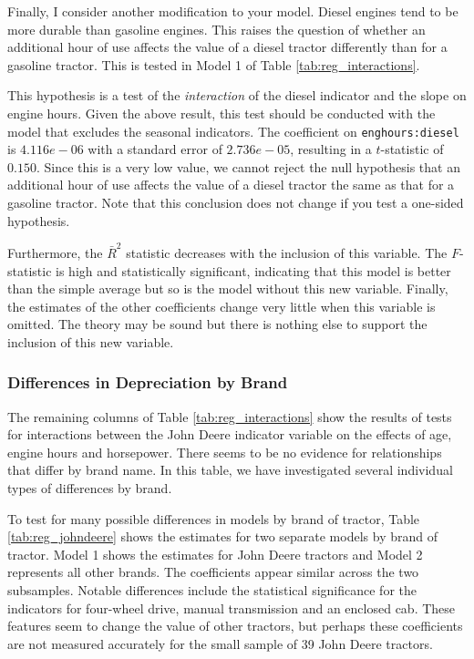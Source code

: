 \documentclass[11pt]{paper}
\begin{document}
Finally, I consider another modification to your model. 
Diesel engines tend to be more durable than gasoline engines. 
This raises the question of whether an additional hour of use affects the value of a diesel tractor differently than for a gasoline tractor. 
This is tested in Model 1 of Table \ref{tab:reg_interactions}. 

	This hypothesis is a test of the \emph{interaction} of the diesel indicator and the slope on engine hours. 
      Given the above result, this test should be conducted with the model that excludes the seasonal indicators. 
The coefficient on \texttt{enghours:diesel} is $4.116e-06$ with a standard error of $2.736e-05$, resulting in a $t$-statistic of $0.150$. 
Since this is a very low value, we cannot reject the null hypothesis that an additional hour of use affects the value of a diesel tractor the same as that for a gasoline tractor. 
Note that this conclusion does not change if you test a one-sided hypothesis.  

Furthermore, the $\bar{R}^2$ statistic decreases with the inclusion of this variable. 
The $F$-statistic is high and statistically significant, indicating that this model is better than the simple average but so is the model without this new variable. 
Finally, the estimates of the other coefficients change very little when this variable is omitted. 
The theory may be sound but there is nothing else to support the inclusion of this new variable. 

\pagebreak
\subsubsection{Differences in Depreciation by Brand}

The remaining columns of Table \ref{tab:reg_interactions}
show the results of tests for interactions
between the John Deere indicator variable
on the effects of age, engine hours and horsepower. 
There seems to be no evidence for relationships that differ by
brand name. 
In this table, we have investigated several 
individual types of differences by brand. 



To test for many possible differences in 
models by brand of tractor, 
Table \ref{tab:reg_johndeere}
shows the estimates for two separate models
by brand of tractor.
Model 1 shows the estimates for John Deere tractors
and Model 2 represents all other brands. 
The coefficients appear similar across the two subsamples.
Notable differences include the statistical significance for 
the indicators for four-wheel drive, 
manual transmission and an enclosed cab. 
These features seem to change the value of 
other tractors, but perhaps these coefficients are not measured 
accurately for the small sample of 39 
John Deere tractors. 
\end{document}
